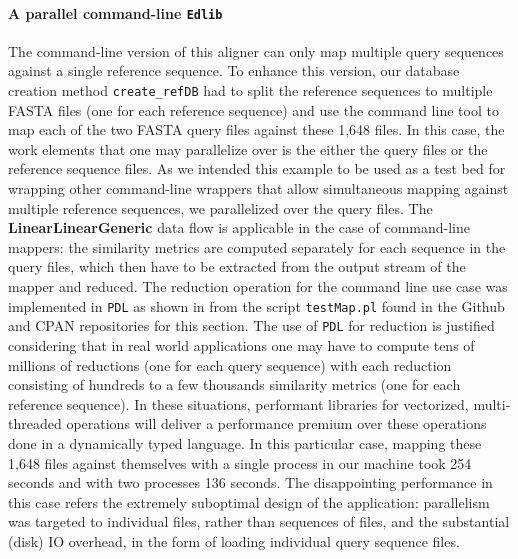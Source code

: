 \documentclass[10pt]{article}
\begin{document}
\paragraph{A parallel command-line \texttt{Edlib}} The command-line version of this aligner can only map multiple query sequences against a single reference sequence. To enhance this version, our database creation method \texttt{create\_refDB} had to split the reference sequences to multiple FASTA files (one for each reference sequence) and use the command line tool to map each of the two FASTA query files against these 1,648 files. In this case, the work elements that one may parallelize over is the either the query files or the reference sequence files. As we intended this example to be used as a test bed for wrapping other command-line wrappers that allow simultaneous mapping against multiple reference sequences, we parallelized over the query files. The \textbf{LinearLinearGeneric} data flow is applicable in the case of command-line mappers: the similarity metrics are computed separately for each sequence in the query files, which then have to be extracted from the output stream of the mapper and reduced. The reduction operation for the command line use case was implemented in \texttt{PDL} as shown in  from the script \texttt{testMap.pl} found in the Github and CPAN repositories for this section. The use of \texttt{PDL} for reduction is justified considering that in real world applications one may have to compute tens of millions of reductions (one for each query sequence) with each reduction consisting of hundreds to a few thousands similarity metrics (one for each reference sequence). In these situations, performant libraries for vectorized, multi-threaded operations will deliver a performance premium over these operations done in a dynamically typed language. In this particular case, mapping these 1,648 files against themselves with a single process in our machine took 254 seconds and with two processes 136 seconds. The disappointing performance in this case refers the extremely suboptimal design of the application: parallelism was targeted to individual files, rather than sequences of files, and the substantial (disk) IO overhead, in the form of loading individual query sequence files. 
\end{document}
